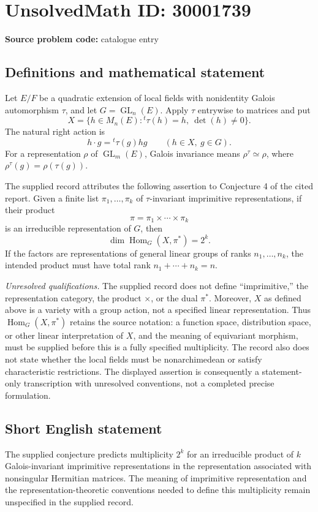 \documentclass[11pt]{article}
\begin{document}
\section*{UnsolvedMath ID: 30001739}
\textbf{Source problem code:} catalogue entry
\subsection{Definitions and mathematical statement}
Let \(E/F\) be a quadratic extension of local fields with nonidentity Galois automorphism \(\tau\), and let \(G=\operatorname{GL}_n(E)\). Apply \(\tau\) entrywise to matrices and put
\[
X=\{h\in M_n(E):{}^t\tau(h)=h,\ \det(h)\ne0\}.
\]
The natural right action is
\[
h\cdot g={}^t\tau(g)hg\qquad(h\in X,\ g\in G).
\]
For a representation \(\rho\) of \(\operatorname{GL}_m(E)\), Galois invariance means \(\rho^\tau\simeq\rho\), where \(\rho^\tau(g)=\rho(\tau(g))\).

The supplied record attributes the following assertion to Conjecture 4 of the cited report. Given a finite list \(\pi_1,\ldots,\pi_k\) of \(\tau\)-invariant imprimitive representations, if their product
\[
\pi=\pi_1\times\cdots\times\pi_k
\]
is an irreducible representation of \(G\), then
\[
\dim\operatorname{Hom}_G(X,\pi^*)=2^k.
\]
If the factors are representations of general linear groups of ranks \(n_1,\ldots,n_k\), the intended product must have total rank \(n_1+\cdots+n_k=n\).

\textit{Unresolved qualifications.} The supplied record does not define ``imprimitive,'' the representation category, the product \(\times\), or the dual \(\pi^*\). Moreover, \(X\) as defined above is a variety with a group action, not a specified linear representation. Thus \(\operatorname{Hom}_G(X,\pi^*)\) retains the source notation: a function space, distribution space, or other linear interpretation of \(X\), and the meaning of equivariant morphism, must be supplied before this is a fully specified multiplicity. The record also does not state whether the local fields must be nonarchimedean or satisfy characteristic restrictions. The displayed assertion is consequently a statement-only transcription with unresolved conventions, not a completed precise formulation.
\subsection{Short English statement}
The supplied conjecture predicts multiplicity \(2^k\) for an irreducible product of \(k\) Galois-invariant imprimitive representations in the representation associated with nonsingular Hermitian matrices. The meaning of imprimitive representation and the representation-theoretic conventions needed to define this multiplicity remain unspecified in the supplied record.
\end{document}
